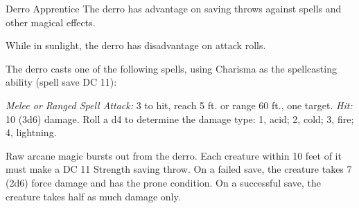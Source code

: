 \documentclass[10pt,a4paper,twoside,bg=print,twocolumn,openany,nodeprecatedcode]{dndbook}
\begin{document}
\begin{DndMonster}[float=t]{Derro Apprentice}
\DndMonsterBasics[
armor-class = {13 (\textit{leather armor})},
hit-points = {\DndDice{5d6 + 5}},
speed = {30 ft.}
]
\DndMonsterAbilityScores[
 str = 9,
 dex = 14,
 con = 12,
 int = 11,
 wis = 5,
 cha = 12
]
\DndMonsterDetails[
skills = {Stealth +4},
senses = {darkvision 120 ft., passive perception 7},
languages = {Dwarvish, Undercommon},
challenge = 1,
]
The derro has advantage on saving throws against spells and other magical effects.

While in sunlight, the derro has disadvantage on attack rolls.

The derro casts one of the following spells, using Charisma as the spellcasting ability (spell save DC 11):
\begin{DndMonsterSpells}
\end{DndMonsterSpells}
\textsl{Melee or Ranged Spell Attack:} 3 to hit, reach 5 ft. or range 60 ft., one target. \textsl{Hit:} 10 (3d6) damage. Roll a d4 to determine the damage type: 1, acid; 2, cold; 3, fire; 4, lightning.

Raw arcane magic bursts out from the derro. Each creature within 10 feet of it must make a DC 11 Strength saving throw. On a failed save, the creature takes 7 (2d6) force damage and has the prone condition. On a successful save, the creature takes half as much damage only.

\end{DndMonster}
\end{document}

